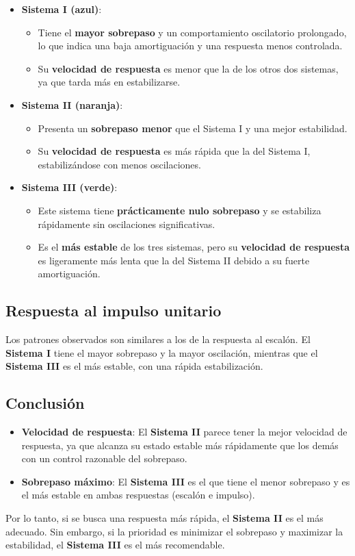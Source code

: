 \documentclass[10pt]{article}
\theoremstyle{definition}
\theoremstyle{remark}
\theoremstyle{definition}
\numberwithin{equation}{prob}
\begin{document}
\begin{itemize}
    \item \textbf{Sistema I (azul)}: 
    \begin{itemize}
        \item Tiene el \textbf{mayor sobrepaso} y un comportamiento oscilatorio prolongado, lo que indica una baja amortiguación y una respuesta menos controlada.
        \item Su \textbf{velocidad de respuesta} es menor que la de los otros dos sistemas, ya que tarda más en estabilizarse.
    \end{itemize}
    \item \textbf{Sistema II (naranja)}: 
    \begin{itemize}
        \item Presenta un \textbf{sobrepaso menor} que el Sistema I y una mejor estabilidad.
        \item Su \textbf{velocidad de respuesta} es más rápida que la del Sistema I, estabilizándose con menos oscilaciones.
    \end{itemize}
    \item \textbf{Sistema III (verde)}: 
    \begin{itemize}
        \item Este sistema tiene \textbf{prácticamente nulo sobrepaso} y se estabiliza rápidamente sin oscilaciones significativas.
        \item Es el \textbf{más estable} de los tres sistemas, pero su \textbf{velocidad de respuesta} es ligeramente más lenta que la del Sistema II debido a su fuerte amortiguación.
    \end{itemize}
\end{itemize}

\subsection{Respuesta al impulso unitario}

Los patrones observados son similares a los de la respuesta al escalón. El \textbf{Sistema I} tiene el mayor sobrepaso y la mayor oscilación, mientras que el \textbf{Sistema III} es el más estable, con una rápida estabilización.

\subsection{Conclusión}

\begin{itemize}
    \item \textbf{Velocidad de respuesta}: El \textbf{Sistema II} parece tener la mejor velocidad de respuesta, ya que alcanza su estado estable más rápidamente que los demás con un control razonable del sobrepaso.
    \item \textbf{Sobrepaso máximo}: El \textbf{Sistema III} es el que tiene el menor sobrepaso y es el más estable en ambas respuestas (escalón e impulso).
\end{itemize}

Por lo tanto, si se busca una respuesta más rápida, el \textbf{Sistema II} es el más adecuado. Sin embargo, si la prioridad es minimizar el sobrepaso y maximizar la estabilidad, el \textbf{Sistema III} es el más recomendable.
\end{document}
